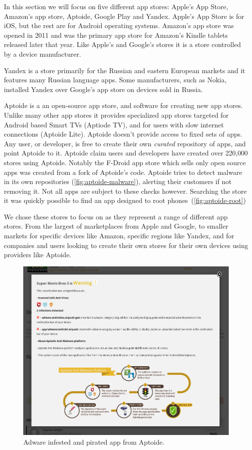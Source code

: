 \documentclass[thesis.tex]{subfiles}
\begin{document}
In this section we will focus on five different app stores: Apple's App Store,
Amazon's app store, Aptoide, Google Play and Yandex.  Apple's App Store is for iOS,
but the rest are for Android operating systems.  
Amazon's app store was opened in 2011 and was the primary app store for Amazon's
Kindle tablets released later that year.  Like Apple's
and Google's stores it is a
store controlled by a device manufacturer.

Yandex is a store primarily for the Russian and eastern European markets
and it features many Russian language apps. Some manufacturers,
such as Nokia, installed Yandex over Google's app store on devices sold in
Russia.

Aptoide is a an open-source app store, and software for creating new
app stores.  Unlike many other app stores it provides specialized app
stores targeted for Android based Smart TVs (Aptiode TV), and for
users with slow internet connections (Aptoide Lite).  Aptoide doesn't
provide access to fixed sets of apps.  Any user, or developer, is free
to create their own \emph{curated} repository of apps, and point
Aptoide to it.  Aptoide claim users and developers have created over
220,000 stores using Aptoide. Notably the F-Droid app store which
sells only open source apps was created from a fork of Aptoide's code.
Aptoide tries to detect malware in its own repositories
(\autoref{fig:aptoide-malware}), alerting their customers if
not removing it.  Not all apps are subject to these checks however.
Searching the store it was quickly possible to find an app designed to
root phones~(\autoref{fig:aptoide-root})

We chose these stores to focus on as they represent a range of
different app stores.  From the largest of marketplaces from Apple and
Google, to smaller markets for specific devices like Amazon, specific
regions like Yandex, and for companies and users looking to create
their own stores for their own devices using providers like Aptoide.

\begin{figure}
  \centering
  \includegraphics[width=0.8\linewidth]{figures/aptoide-malware.png}
  \caption{Adware infested and pirated app from Aptoide.}
  \label{fig:aptoide-malware}
\end{figure}
\end{document}
